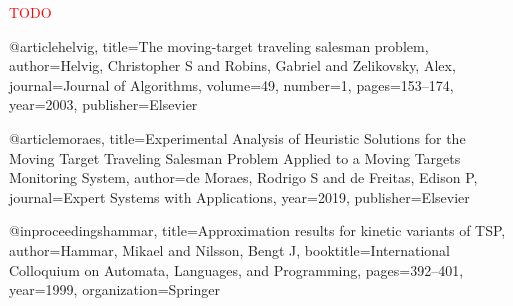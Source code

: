 \documentclass[english,version-2019-07]{uzl-thesis}
\begin{document}
\textcolor{red}{TODO}



%

\begin{bibtex-entries}

@article{helvig,
  title={The moving-target traveling salesman problem},
  author={Helvig, Christopher S and Robins, Gabriel and Zelikovsky, Alex},
  journal={Journal of Algorithms},
  volume={49},
  number={1},
  pages={153--174},
  year={2003},
  publisher={Elsevier}
}

@article{moraes,
  title={Experimental Analysis of Heuristic Solutions for the Moving Target Traveling Salesman Problem Applied to a Moving Targets Monitoring System},
  author={de Moraes, Rodrigo S and de Freitas, Edison P},
  journal={Expert Systems with Applications},
  year={2019},
  publisher={Elsevier}
}

@inproceedings{hammar,
  title={Approximation results for kinetic variants of TSP},
  author={Hammar, Mikael and Nilsson, Bengt J},
  booktitle={International Colloquium on Automata, Languages, and Programming},
  pages={392--401},
  year={1999},
  organization={Springer}
}


\end{bibtex-entries}
\end{document}
